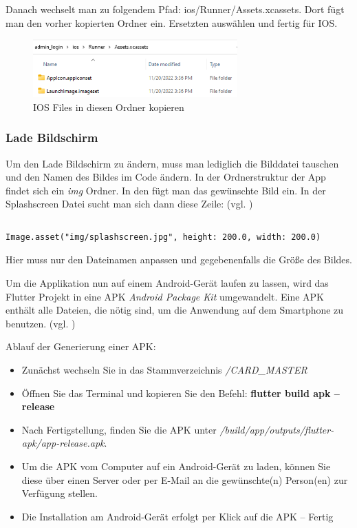 Danach wechselt man zu folgendem Pfad: ios/Runner/Assets.xcassets. Dort fügt man den vorher kopierten Ordner ein. Ersetzten auswählen und fertig für IOS.
\begin{figure}[!h]
\centering
\includegraphics[width=0.7\textwidth]{FLUTTER/images/ZB/ios_icons_copy_to.png}
\caption{IOS Files in diesen Ordner kopieren}
\end{figure}

\newpage

\subsubsection{Lade Bildschirm}
Um den Lade Bildschirm zu ändern, muss man lediglich die Bilddatei tauschen und den Namen des Bildes im Code ändern. In der Ordnerstruktur der App findet sich ein {\textit{img}} Ordner. In den fügt man das gewünschte Bild ein. In der Splashscreen Datei sucht man sich dann diese Zeile: (vgl. \cite{SplashScreen})

\vspace{0.5cm}
\begin{lstlisting}[caption=Dateiname anpassen und die größe]

\end{lstlisting}
\begin{lstlisting}[style=flutterListingStyle,caption={App Icon importieren},label={lst:appIconSetzen}] 
Image.asset("img/splashscreen.jpg", height: 200.0, width: 200.0)
\end{lstlisting}
Hier muss nur den Dateinamen anpassen und gegebenenfalls die Größe des Bildes.

\newpage

Um die Applikation nun auf einem Android-Gerät laufen zu lassen, wird das Flutter Projekt in eine APK {\textit{Android Package Kit}} umgewandelt. Eine APK enthält alle Dateien, die nötig sind, um die Anwendung auf dem Smartphone zu benutzen. (vgl. \cite{Generierung-AppBundle})

Ablauf der Generierung einer APK:
\begin{itemize}
    \item Zunächst wechseln Sie in das Stammverzeichnis {\textit{/CARD\_MASTER}}
    \item Öffnen Sie das Terminal und kopieren Sie den Befehl: {\textbf{flutter build apk --release}}
    \item Nach Fertigstellung, finden Sie die APK unter {\textit{/build/app/outputs/flutter-apk/app-release.apk}}.
    \item Um die APK vom Computer auf ein Android-Gerät zu laden, können Sie diese über einen Server oder per E-Mail an die gewünschte(n) Person(en) zur Verfügung stellen.
    \item Die Installation am Android-Gerät erfolgt per Klick auf die APK – Fertig 
\end{itemize}


